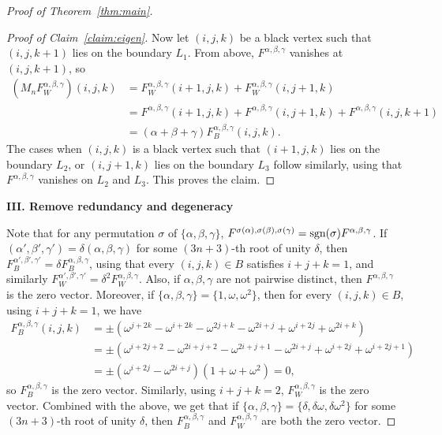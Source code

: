 \documentclass{article}
\begin{document}
\begin{proof}[Proof of Theorem~\ref{thm:main}]
\begin{proof}[Proof of Claim~\ref{claim:eigen}]
Now let $(i,j,k)$ be a black vertex such that $(i,j,k+1)$ lies on the boundary $L_1$. From above, $F^{\alpha,\beta,\gamma}$ vanishes at $(i,j,k+1)$, so
\begin{align*}
(M_nF_W^{\alpha,\beta,\gamma})(i,j,k)&=F_W^{\alpha,\beta,\gamma}(i+1,j,k)+F_W^{\alpha,\beta,\gamma}(i,j+1,k)\\
&=F^{\alpha,\beta,\gamma}(i+1,j,k)+F^{\alpha,\beta,\gamma}(i,j+1,k)+F^{\alpha,\beta,\gamma}(i,j,k+1)\\
&=(\alpha+\beta+\gamma)F_B^{\alpha,\beta,\gamma}(i,j,k).
\end{align*}
The cases when $(i,j,k)$ is a black vertex such that $(i+1,j,k)$ lies on the boundary $L_2$, or $(i,j+1,k)$ lies on the boundary $L_3$ follow similarly, using that $F^{\alpha,\beta,\gamma}$ vanishes on $L_2$ and $L_3$. This proves the claim.
\renewcommand{\qedsymbol}{$\boxdot$}
\end{proof}
\renewcommand{\qedsymbol}{$\square$}

\textbf{III. Remove redundancy and degeneracy}

Note that for any permutation $\sigma$ of $\{\alpha,\beta,\gamma\}$, $F^{\sigma(\alpha),\sigma(\beta),\sigma(\gamma)}=\textup{sgn}(\sigma)F^{\alpha,\beta,\gamma}$. If $(\alpha',\beta',\gamma')=\delta(\alpha,\beta,\gamma)$ for some $(3n+3)$-th root of unity $\delta$, then $F_B^{\alpha',\beta',\gamma'}=\delta F_B^{\alpha,\beta,\gamma}$, using that every $(i,j,k)\in B$ satisfies $i+j+k=1$, and similarly $F_W^{\alpha',\beta',\gamma'}=\delta^2 F_W^{\alpha,\beta,\gamma}$. Also, if $\alpha,\beta,\gamma$ are not pairwise distinct, then $F^{\alpha,\beta,\gamma}$ is the zero vector. Moreover, if $\{\alpha,\beta,\gamma\}=\{1,\omega,\omega^2\}$, then for every $(i,j,k)\in B$, using $i+j+k=1$, we have
\begin{align*}
F_B^{\alpha,\beta,\gamma}(i,j,k)&=\pm(\omega^{j+2k}-\omega^{i+2k}-\omega^{2j+k}-\omega^{2i+j}+\omega^{i+2j}+\omega^{2i+k})\\
&=\pm(\omega^{i+2j+2}-\omega^{2i+j+2}-\omega^{2i+j+1}-\omega^{2i+j}+\omega^{i+2j}+\omega^{i+2j+1})\\
&=\pm(\omega^{i+2j}-\omega^{2i+j})(1+\omega+\omega^2)=0,
\end{align*}
so $F_B^{\alpha,\beta,\gamma}$ is the zero vector. Similarly, using $i+j+k=2$, $F_W^{\alpha,\beta,\gamma}$ is the zero vector. Combined with the above, we get that if $\{\alpha,\beta,\gamma\}=\{\delta,\delta\omega,\delta\omega^2\}$ for some $(3n+3)$-th root of unity $\delta$, then $F^{\alpha,\beta,\gamma}_B$ and $F^{\alpha,\beta,\gamma}_W$ are both the zero vector.


\end{proof}
\end{document}
